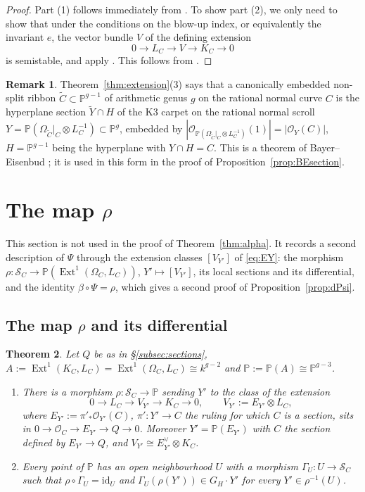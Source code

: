 \documentclass[11pt,reqno]{amsart}
\theoremstyle{plain}
\newtheorem{theorem}{Theorem}[section]
\theoremstyle{definition}
\newtheorem{remark}[theorem]{Remark}
\newcommand{\PP}{\mathbb{P}}
\newcommand{\OO}{\mathcal{O}}
\newcommand{\Ext}{\operatorname{Ext}}
\newcommand{\id}{\mathrm{id}}
\newcommand{\Yt}{\widetilde{Y}}
\newcommand{\Ct}{\widetilde{C}}
\newcommand{\SC}{\mathcal{S}_C}
\newcommand{\GH}{G_H}
\begin{document}
\begin{proof}
Part (1) follows immediately from \cite[Theorem~5.1(1)]{DM25}. To show part (2), we only need to show that under the conditions on the blow-up index, or equivalently the invariant $e$, the vector bundle $V$ of the defining extension
\[
0\to L_C\to V\to K_C\to0
\]
is semistable, and apply \cite[Theorem~5.1(2)]{DM25}. This follows from \cite[Corollary~4.5]{DM24}.
\end{proof}

\begin{remark}\label{rem:BE}
Theorem~\ref{thm:extension}(3) says that a canonically embedded non-split ribbon $\Ct\subset\PP^{g-1}$ of arithmetic genus $g$ on the rational normal curve $C$ is the hyperplane section $\Yt\cap H$ of the K3 carpet on the rational normal scroll $Y=\PP(\Omega_{\Ct}|_C\otimes L_C^{-1})\subset\PP^{g}$, embedded by $|\OO_{\PP(\Omega_{\Ct}|_C\otimes L_C^{-1})}(1)|=|\OO_Y(C)|$, $H=\PP^{g-1}$ being the hyperplane with $Y\cap H=C$. This is a theorem of Bayer--Eisenbud \cite[\S8]{BE95}; it is used in this form in the proof of Proposition~\ref{prop:BEsection}.
\end{remark}

\section{The map \texorpdfstring{$\rho$}{rho}}\label{sec:rho}

This section is not used in the proof of Theorem~\ref{thm:alpha}. It records a second description of $\Psi$ through the extension classes $[V_{Y'}]$ of \eqref{eq:EY}: the morphism $\rho\colon\SC\to\PP(\Ext^1(\Omega_C,L_C))$, $Y'\mapsto[V_{Y'}]$, its local sections and its differential, and the identity $\beta\circ\Psi=\rho$, which gives a second proof of Proposition~\ref{prop:dPsi}.

\subsection{The map \texorpdfstring{$\rho$}{rho} and its differential}\label{subsec:rho}

\begin{theorem}\label{thm:rho}
Let $Q$ be as in \S\ref{subsec:sections}, $A:=\Ext^1(K_C,L_C)=\Ext^1(\Omega_C,L_C)\cong k^{g-2}$ and $\PP:=\PP(A)\cong\PP^{g-3}$.
\begin{enumerate}
\item There is a morphism $\rho\colon\SC\to\PP$ sending $Y'$ to the class of the extension
\[
0\to L_C\to V_{Y'}\to K_C\to0,\qquad V_{Y'}:=E_{Y'}\otimes L_C,
\]
where $E_{Y'}:=\pi'_*\OO_{Y'}(C)$, $\pi'\colon Y'\to C$ the ruling for which $C$ is a section, sits in $0\to\OO_C\to E_{Y'}\to Q\to0$. Moreover $Y'=\PP(E_{Y'})$ with $C$ the section defined by $E_{Y'}\to Q$, and $V_{Y'}\cong E_{Y'}^{\vee}\otimes K_C$.
\item Every point of $\PP$ has an open neighbourhood $U$ with a morphism $\Gamma_U\colon U\to\SC$ such that $\rho\circ\Gamma_U=\id_U$ and $\Gamma_U(\rho(Y'))\in\GH\cdot Y'$ for every $Y'\in\rho^{-1}(U)$.
\end{enumerate}
\end{theorem}
\end{document}
